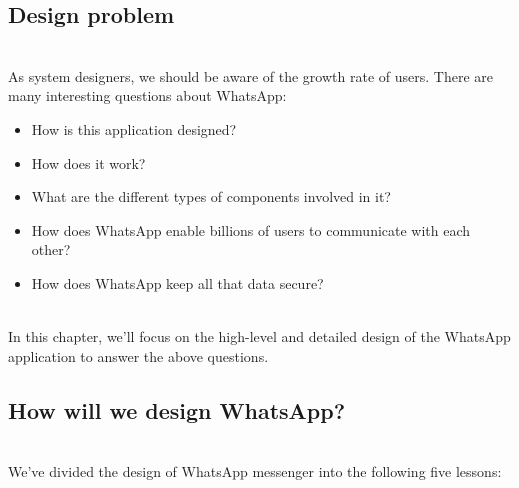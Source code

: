 \subsection{Design problem}\label{9T16f0WsptV88TYQrPseQ}
\\
As system designers, we should be aware of the growth rate of users. There are many interesting questions about WhatsApp:

\begin{itemize}
\item
\protect{}\label{zDe1ycK8WcOkBV_X57Djf}
How is this application designed?
\item
\protect{}\label{4ZQ5d1_z0L5B2IJw-9XTb}
How does it work?
\item
\protect{}\label{2J6v1aie8ERHV3_OzN7v6}
What are the different types of components involved in it?
\item
\protect{}\label{GwVU9eNuOCeUmDngj5v0C}
How does WhatsApp enable billions of users to communicate with each other?
\item
\protect{}\label{7oi5rUForVqxyaKK6IsXJ}
How does WhatsApp keep all that data secure?
\end{itemize}
\\
In this chapter, we'll focus on the high-level and detailed design of the WhatsApp application to answer the above questions.

\subsection{How will we design WhatsApp?}\label{D6RyAho_ADmmtSb3nFDPm}
\\
We've divided the design of WhatsApp messenger into the following five lessons:

